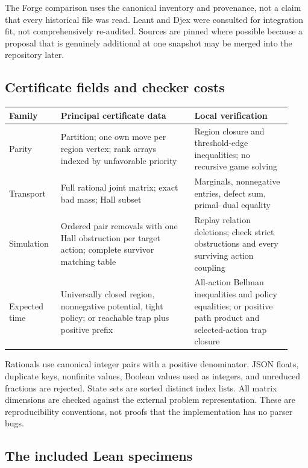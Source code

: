The Forge comparison uses the canonical inventory and provenance, not a claim
that every historical file was read. Leant and Djex were consulted for
integration fit, not comprehensively re-audited. Sources are pinned where
possible because a proposal that is genuinely additional at one snapshot may
be merged into the repository later.

\subsection{Certificate fields and checker costs}

\begin{longtable}{@{}L{0.17\linewidth}L{0.44\linewidth}L{0.32\linewidth}@{}}
\toprule
Family & Principal certificate data & Local verification \\
\midrule
\endhead
Parity & Partition; one own move per region vertex; rank arrays indexed by
unfavorable priority & Region closure and threshold-edge inequalities; no
recursive game solving \\
Transport & Full rational joint matrix; exact bad mass; Hall subset & Marginals,
nonnegative entries, defect sum, primal--dual equality \\
Simulation & Ordered pair removals with one Hall obstruction per target action;
complete survivor matching table & Replay relation deletions; check strict
obstructions and every surviving action coupling \\
Expected time & Universally closed region, nonnegative potential, tight policy;
or reachable trap plus positive prefix & All-action Bellman inequalities and
policy equalities; or positive path product and selected-action trap closure \\
\bottomrule
\end{longtable}

Rationals use canonical integer pairs  with a
positive denominator. JSON floats, duplicate keys, nonfinite values, Boolean
values used as integers, and unreduced fractions are rejected. State sets are
sorted distinct index lists. All matrix dimensions are checked against the
external problem representation. These are reproducibility conventions, not
proofs that the implementation has no parser bugs.

\subsection{The included Lean specimens}

